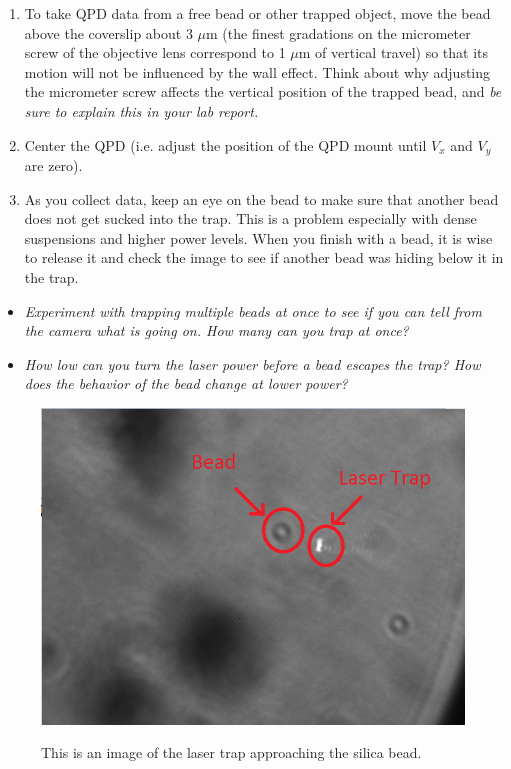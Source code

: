 \documentclass{../lab}
\begin{document}
\begin{enumerate}
    \item To take QPD data from a free bead or other trapped object, move the bead above the coverslip about 3 $\mu$m (the finest gradations on the micrometer screw of the objective lens correspond to 1 $\mu$m of vertical travel) so that its motion will not be influenced by the wall effect. Think about why adjusting the micrometer screw affects the vertical position of the trapped bead, and \emph{be sure to explain this in your lab report.}

    \item Center the QPD (i.e. adjust the position of the QPD mount until $V_x$ and $V_y$ are zero).

    \item As you collect data, keep an eye on the bead to make sure that another bead does not get sucked into the trap. This is a problem especially with dense suspensions and higher power levels. When you finish with a bead, it is wise to release it and check the image to see if another bead was hiding below it in the trap.
\end{enumerate}

\begin{itemize}
    \item \emph{Experiment with trapping multiple beads at once to see if you can tell from the camera what is going on. How many can you trap at once?}

    \item \emph{How low can you turn the laser power before a bead escapes the trap? How does the behavior of the bead change at lower power?}
\end{itemize}

\begin{figure}[h]
    \centering
    \href{http://experimentationlab.berkeley.edu/sites/default/files/OTZ/laserwithbead.png}{\includegraphics[width=0.5\linewidth]{images/laserwithbead.png}}
    \caption{This is an image of the laser trap approaching the silica bead.}
    \label{fig:laserwithbead}
\end{figure}
\end{document}
